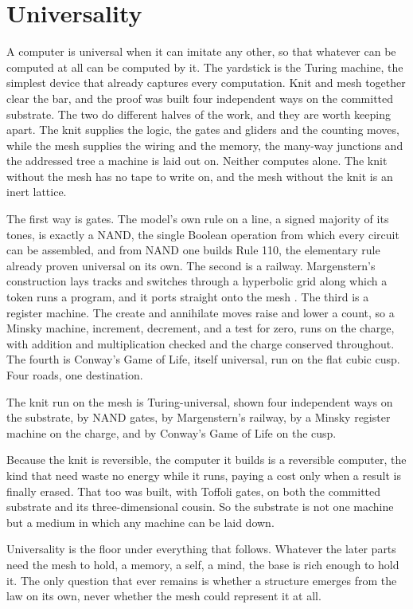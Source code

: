 \section{Universality}

A computer is universal when it can imitate any other, so that whatever can be computed at all can be computed by it. The yardstick is the Turing machine, the simplest device that already captures every computation. Knit and mesh together clear the bar, and the proof was built four independent ways on the committed substrate. The two do different halves of the work, and they are worth keeping apart. The knit supplies the logic, the gates and gliders and the counting moves, while the mesh supplies the wiring and the memory, the many-way junctions and the addressed tree a machine is laid out on. Neither computes alone. The knit without the mesh has no tape to write on, and the mesh without the knit is an inert lattice.

The first way is gates. The model's own rule on a line, a signed majority of its tones, is exactly a NAND, the single Boolean operation from which every circuit can be assembled, and from NAND one builds Rule 110, the elementary rule already proven universal on its own. The second is a railway. Margenstern's construction lays tracks and switches through a hyperbolic grid along which a token runs a program, and it ports straight onto the mesh \cite{margenstern2008}. The third is a register machine. The create and annihilate moves raise and lower a count, so a Minsky machine, increment, decrement, and a test for zero, runs on the charge, with addition and multiplication checked and the charge conserved throughout. The fourth is Conway's Game of Life, itself universal, run on the flat cubic cusp. Four roads, one destination.

\begin{result}
The knit run on the mesh is Turing-universal, shown four independent ways on the substrate, by NAND gates, by Margenstern's railway, by a Minsky register machine on the charge, and by Conway's Game of Life on the cusp. \cite{pollard2026vibetest}
\end{result}

Because the knit is reversible, the computer it builds is a reversible computer, the kind that need waste no energy while it runs, paying a cost only when a result is finally erased. That too was built, with Toffoli gates, on both the committed substrate and its three-dimensional cousin. So the substrate is not one machine but a medium in which any machine can be laid down.

Universality is the floor under everything that follows. Whatever the later parts need the mesh to hold, a memory, a self, a mind, the base is rich enough to hold it. The only question that ever remains is whether a structure emerges from the law on its own, never whether the mesh could represent it at all.
